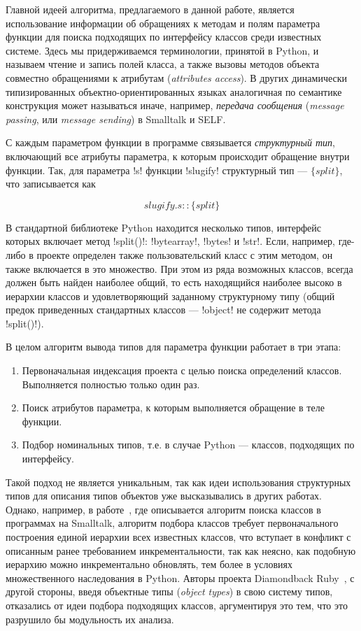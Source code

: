 Главной идеей алгоритма, предлагаемого в данной работе, является использование
информации об обращениях к методам и полям параметра функции для поиска
подходящих по интерфейсу классов среди известных системе. Здесь мы
придерживаемся терминологии, принятой в Python, и называем чтение и запись полей
класса, а также вызовы методов объекта совместно обращениями к атрибутам
(\emph{attributes access}). В других динамически типизированных
объектно-ориентированных языках аналогичная по семантике конструкция может
называться иначе, например, \emph{передача сообщения} (\emph{message passing},
или \emph{message sending}) в Smalltalk и SELF.

С каждым параметром функции в программе связывается \emph{структурный тип},
включающий все атрибуты параметра, к которым происходит обращение внутри
функции. Так, для параметра !s! функции !slugify! структурный тип ---
$\{split\}$, что записывается как 

\[
    slugify.s :: \{ split \}
\]

В стандартной библиотеке Python находится несколько типов, интерфейс которых
включает метод !split()!: !bytearray!, !bytes! и !str!. Если, например, где-либо
в проекте определен также пользовательский класс с этим методом, он также
включается в это множество. При этом из ряда возможных классов, всегда должен
быть найден наиболее общий, то есть находящийся наиболее высоко в иерархии
классов и удовлетворяющий заданному структурному типу (общий предок приведенных
стандартных классов --- !object! не содержит метода !split()!).

В целом алгоритм вывода типов для параметра функции работает в три этапа:

\begin{enumerate}
    \item{Первоначальная индексация проекта с целью поиска определений классов.
      Выполняется полностью только один раз.}
    \item{Поиск атрибутов параметра, к которым выполняется обращение в теле
        функции.}
    \item{Подбор номинальных типов, т.е. в случае Python --- классов, подходящих
      по интерфейсу.}
\end{enumerate}

Такой подход не является уникальным, так как идеи использования структурных
типов для описания типов объектов уже высказывались в других работах.
Однако, например, в работе~\cite{Pluquet2009}, где описывается алгоритм поиска
классов в программах на Smalltalk, алгоритм подбора классов требует
первоначального построения единой иерархии всех известных классов, что вступает
в конфликт с описанным ранее требованием инкрементальности, так как неясно, как
подобную иерархию можно инкрементально обновлять, тем более в условиях
множественного наследования в Python.  Авторы проекта Diamondback
Ruby~\cite{Furr2009}, с другой стороны, введя объектные типы (\emph{object
  types}) в свою систему типов, отказались от идеи подбора подходящих классов,
аргументируя это тем, что это разрушило бы модульность их анализа.

